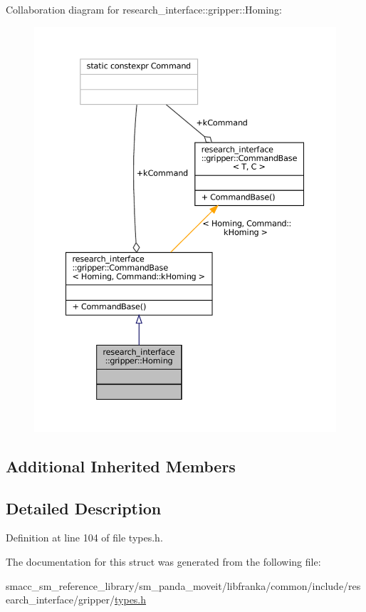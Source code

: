 Collaboration diagram for research\+\_\+interface\+:\+:gripper\+:\+:Homing\+:
\nopagebreak
\begin{figure}[H]
\begin{center}
\leavevmode
\includegraphics[width=350pt]{structresearch__interface_1_1gripper_1_1Homing__coll__graph}
\end{center}
\end{figure}
\subsection*{Additional Inherited Members}


\subsection{Detailed Description}


Definition at line 104 of file types.\+h.



The documentation for this struct was generated from the following file\+:\begin{DoxyCompactItemize}
\item 
smacc\+\_\+sm\+\_\+reference\+\_\+library/sm\+\_\+panda\+\_\+moveit/libfranka/common/include/research\+\_\+interface/gripper/\hyperlink{types_8h}{types.\+h}\end{DoxyCompactItemize}
